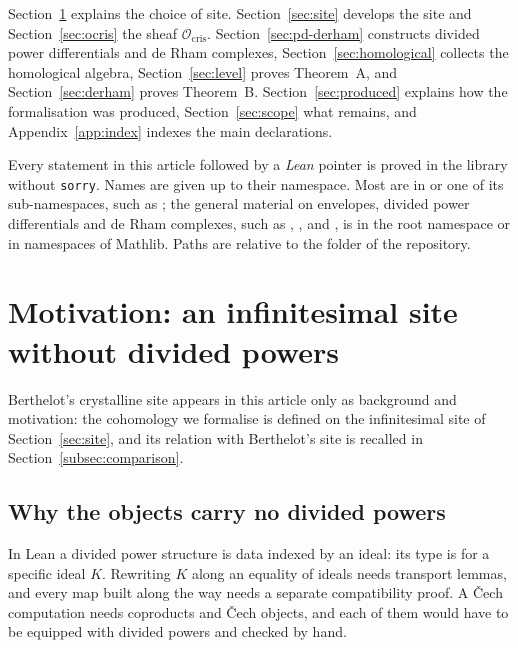 \documentclass[11pt]{amsart}
\newcommand{\spa}{\medskip}
\newcommand{\Ocris}{\mathcal{O}_{\mathrm{cris}}}
\theoremstyle{plain}
\theoremstyle{definition}
\theoremstyle{remark}
\begin{document}
\spa

Section~\ref{sec:motivation} explains the choice of site. Section~\ref{sec:site} develops the site and Section~\ref{sec:ocris} the sheaf $\Ocris$. Section~\ref{sec:pd-derham} constructs divided power differentials and de Rham complexes, Section~\ref{sec:homological} collects the homological algebra, Section~\ref{sec:level} proves Theorem~A, and Section~\ref{sec:derham} proves Theorem~B. Section~\ref{sec:produced} explains how the formalisation was produced, Section~\ref{sec:scope} what remains, and Appendix~\ref{app:index} indexes the main declarations.

\spa

Every statement in this article followed by a \emph{Lean} pointer is proved in the library without \texttt{sorry}. Names are given up to their namespace. Most are in  or one of its sub-namespaces, such as ; the general material on envelopes, divided power differentials and de Rham complexes, such as , ,  and , is in the root namespace or in namespaces of Mathlib. Paths are relative to the folder  of the repository.

\section{Motivation: an infinitesimal site without divided powers}\label{sec:motivation}

Berthelot's crystalline site appears in this article only as background and motivation: the cohomology we formalise is defined on the infinitesimal site of Section~\ref{sec:site}, and its relation with Berthelot's site is recalled in Section~\ref{subsec:comparison}.

\subsection{Why the objects carry no divided powers}

In Lean a divided power structure is data indexed by an ideal: its type is  for a specific ideal $K$. Rewriting $K$ along an equality of ideals needs transport lemmas, and every map built along the way needs a separate compatibility proof. A Čech computation needs coproducts and Čech objects, and each of them would have to be equipped with divided powers and checked by hand.
\end{document}
